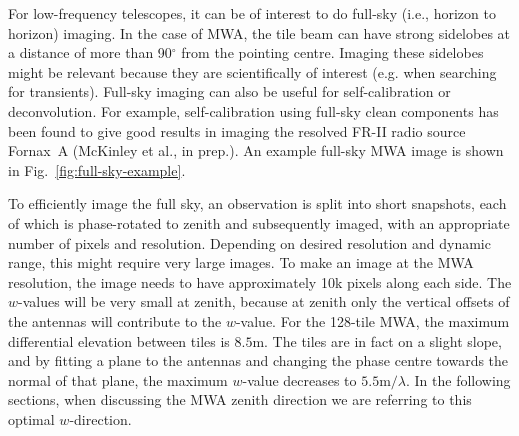 \documentclass[useAMS,usenatbib]{mn2e}
\newcommand{\degree}{\ensuremath{^{\circ}}\xspace}
\begin{document}
For low-frequency telescopes, it can be of interest to do full-sky (i.e., horizon to horizon) imaging. In the case of MWA, the tile beam can have strong sidelobes at a distance of more than 90\degree from the pointing centre. Imaging these sidelobes might be relevant because they are scientifically of interest (e.g. when searching for transients). Full-sky imaging can also be useful for self-calibration or deconvolution. For example, self-calibration using full-sky clean components has been found to give good results in imaging the resolved FR-II radio source Fornax~A (McKinley et al., in prep.). An example full-sky MWA image is shown in Fig.~\ref{fig:full-sky-example}.

To efficiently image the full sky, an observation is split into short snapshots, each of which is phase-rotated to zenith and subsequently imaged, with an appropriate number of pixels and resolution. Depending on desired resolution and dynamic range, this might require very large images. To make an image at the MWA resolution, the image needs to have approximately 10k pixels along each side. The $w$-values will be very small at zenith, because at zenith only the vertical offsets of the antennas will contribute to the $w$-value. For the 128-tile MWA, the maximum differential elevation between tiles is $8.5$m. The tiles are in fact on a slight slope, and by fitting a plane to the antennas and changing the phase centre towards the normal of that plane, the maximum $w$-value decreases to $5.5\textrm{m} / \lambda$. In the following sections, when discussing the MWA zenith direction we are referring to this optimal $w$-direction.
\end{document}
